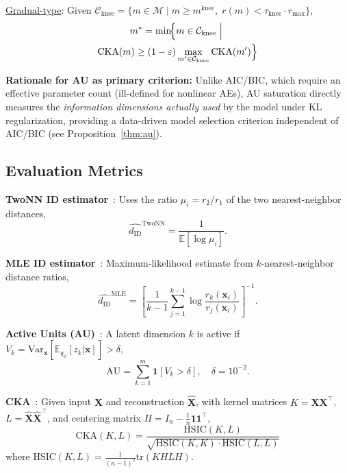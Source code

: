 \documentclass[lettersize,journal]{IEEEtran}
\newcommand{\dID}{d_{\mathrm{ID}}}
\begin{document}
\noindent\underline{Gradual-type}: Given $\mathcal{C}_\mathrm{knee} = \{m \in \mathcal{M} \mid m \geq m^\mathrm{knee},\; r(m) < \tau_\mathrm{knee} \cdot r_\mathrm{max}\}$,
\begin{multline}
  m^* = \min\!\Bigl\{m \in \mathcal{C}_\mathrm{knee} \;\Big|\; \\
  \mathrm{CKA}(m) \geq (1-\varepsilon)\max_{m'\in\mathcal{C}_\mathrm{knee}}\mathrm{CKA}(m')
  \Bigr\}
  \label{eq:dzopt_cka_knee}
\end{multline}

\textbf{Rationale for AU as primary criterion:}
Unlike AIC/BIC, which require an effective parameter count (ill-defined for nonlinear AEs), AU saturation directly measures the \emph{information dimensions actually used} by the model under KL regularization, providing a data-driven model selection criterion independent of AIC/BIC (see Proposition~\ref{thm:au}).

\subsection{Evaluation Metrics}

\textbf{TwoNN ID estimator}~\cite{facco2017twonn}: Uses the ratio $\mu_i = r_2/r_1$ of the two nearest-neighbor distances,
\begin{equation}
  \hat{\dID}^\mathrm{TwoNN} = \frac{1}{\mathbb{E}[\log \mu_i]}.
\end{equation}

\textbf{MLE ID estimator}~\cite{levina2005mle}: Maximum-likelihood estimate from $k$-nearest-neighbor distance ratios,
\begin{equation}
  \hat{\dID}^\mathrm{MLE} = \left[\frac{1}{k-1}\sum_{j=1}^{k-1}\log\frac{r_k(\boldsymbol{x}_i)}{r_j(\boldsymbol{x}_i)}\right]^{-1}.
\end{equation}

\textbf{Active Units (AU)}~\cite{lucas2019elbo}: A latent dimension $k$ is active if
$V_k = \mathrm{Var}_{\boldsymbol{x}}[\mathbb{E}_{q_\phi}[z_k|\boldsymbol{x}]] > \delta$,
\begin{equation}
  \mathrm{AU} = \sum_{k=1}^{m} \mathbf{1}[V_k > \delta], \quad \delta = 10^{-2}.
  \label{eq:au}
\end{equation}

\textbf{CKA}~\cite{kornblith2019cka}: Given input $\boldsymbol{X}$ and reconstruction $\hat{\boldsymbol{X}}$, with kernel matrices $K = \boldsymbol{X}\boldsymbol{X}^\top$, $L = \hat{\boldsymbol{X}}\hat{\boldsymbol{X}}^\top$, and centering matrix $H = I_n - \frac{1}{n}\boldsymbol{1}\boldsymbol{1}^\top$,
\begin{equation}
  \mathrm{CKA}(K, L) = \frac{\mathrm{HSIC}(K, L)}{\sqrt{\mathrm{HSIC}(K,K)\cdot\mathrm{HSIC}(L,L)}}
  \label{eq:cka}
\end{equation}
where $\mathrm{HSIC}(K,L) = \frac{1}{(n-1)^2}\mathrm{tr}(KHLH)$.
\end{document}
